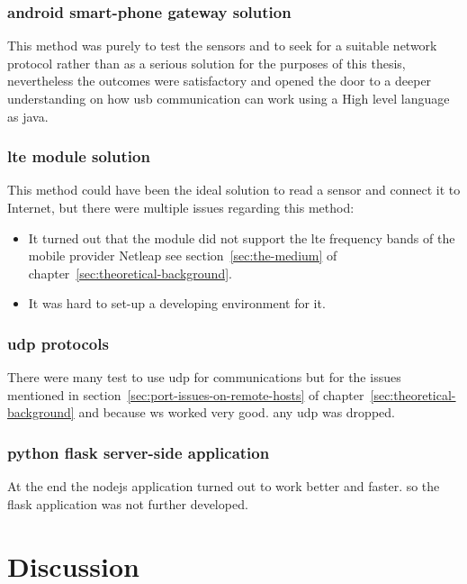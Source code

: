 \documentclass[hidelinks,11pt,a4paper,oneside,article]{memoir}
\begin{document}
\subsection{android smart-phone gateway solution}
This method was purely to test the sensors and to seek for a suitable network protocol rather than as a serious solution for the purposes of this thesis, nevertheless the outcomes were satisfactory and opened the door to a deeper understanding on how \gls{usb} communication can work using a High level language as \gls{java}.

\subsection{\gls{lte} module solution}
This method could have been the ideal solution to read a sensor and connect it to Internet, but there were multiple issues regarding this method:
\begin{itemize}
    \item It turned out that the module did not support the \gls{lte} frequency bands of the mobile provider Netleap see section~\ref{sec:the-medium} of chapter~\ref{sec:theoretical-background}.
    \item It was hard to set-up a developing environment for it.
\end{itemize} 

\subsection{\gls{udp} protocols}
There were many test to use \gls{udp} for communications but for the issues mentioned in section~\ref{sec:port-issues-on-remote-hosts} of chapter~\ref{sec:theoretical-background} and because \gls{ws} worked very good. any \gls{udp} was dropped.

\subsection{python flask server-side application}
At the end the \gls{nodejs} application turned out to work better and faster. so the flask application was not further developed.


\clearpage\chapter{Discussion}\label{sec:discussion}
\end{document}
